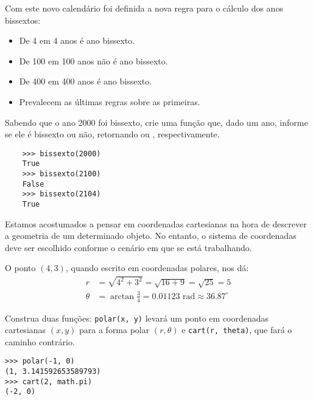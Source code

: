 \documentclass[12pt]{article}
\begin{document}
	Com este novo calendário foi definida a nova regra para o cálculo dos anos bissextos:
	
	\begin{itemize}
		\item De 4 em 4 anos é ano bissexto.
		\item De 100 em 100 anos não é ano bissexto.
		\item De 400 em 400 anos é ano bissexto.
		\item Prevalecem as últimas regras sobre as primeiras.
	\end{itemize}
	
	\quest Sabendo que o ano 2000 foi bissexto, crie uma função que, dado um ano, informe se ele é bissexto ou não, retornando  ou , respectivamente.\\
	
	\example
	\begin{lstlisting}
	>>> bissexto(2000)
	True
	>>> bissexto(2100)
	False
	>>> bissexto(2104)
	True
	\end{lstlisting}
	
	\pagebreak
	
	
	Estamos acostumados a pensar em coordenadas cartesianas na hora de descrever a geometria de um determinado objeto. No entanto, o sistema de coordenadas deve ser escolhido conforme o cenário em que se está trabalhando.
	
	
	
	O ponto $(4, 3)$, quando escrito em coordenadas polares, nos dá:
	\begin{align*}
		r &= \sqrt{4^2 + 3^2} = \sqrt{16 + 9} = \sqrt{25} = 5\\
		\theta &= \arctan\frac{3}{4} = 0.01123 \text{ rad} \approx 36.87^{\circ}
	\end{align*}
	
	\quest Construa duas funções: \texttt{polar(x, y)} levará um ponto em coordenadas cartesianas $(x, y)$ para a forma polar $(r, \theta)$ e \texttt{cart(r, theta)}, que fará o caminho contrário.\\
	
	\example
	\begin{lstlisting}
>>> polar(-1, 0)
(1, 3.141592653589793)
>>> cart(2, math.pi)
(-2, 0)
	\end{lstlisting}
	
	\pagebreak
	
	
\end{document}
